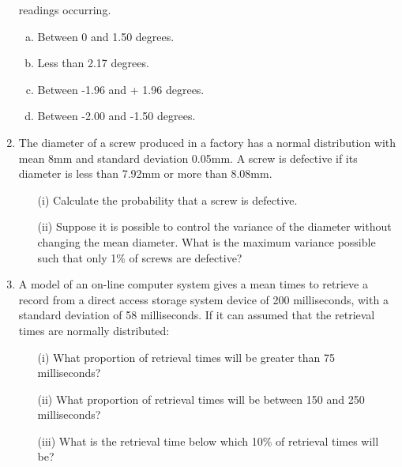 \documentclass[a4paper,12pt]{article}
\begin{document}
\begin{enumerate}
readings occurring.



\begin{enumerate}[(a)]

\item Between 0 and 1.50 degrees.



\item Less than 2.17 degrees.



\item Between -1.96 and + 1.96 degrees.



\item Between -2.00 and -1.50 degrees.



\end{enumerate}



\item
The diameter of a screw produced in a factory has a normal distribution with mean 8mm and standard deviation 0.05mm. A screw is defective if its diameter is less than 7.92mm or more than 8.08mm.
\begin{itemize}
	\item[(i)]	Calculate the probability that a screw is defective.
	
	\item[(ii)] Suppose it is possible to control the variance of the diameter without changing the mean diameter. What is the maximum variance possible such that only 1\% of screws are defective?
\end{itemize}		


\item

A model of an on-line computer system gives a mean times to retrieve a record from a direct access storage system device of 200 milliseconds, with a standard deviation of 58 milliseconds. If it can assumed that the retrieval times are normally distributed:

\begin{itemize}
	\item[(i)] What proportion of retrieval times will be greater than 75 milliseconds?
	\item[(ii)] What proportion of retrieval times will be between 150 and 250 milliseconds?
	\item[(iii)] What is the retrieval time below which 10\% of retrieval times will be?
\end{itemize}


\end{enumerate}
\end{document}
